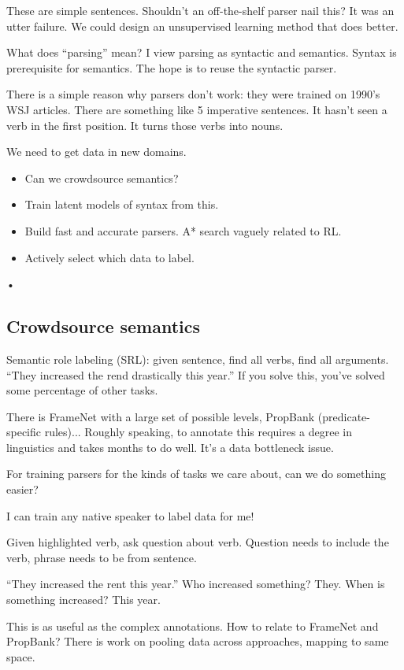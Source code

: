 These are simple sentences. Shouldn't an off-the-shelf parser nail this? It was an utter failure. We could design an unsupervised learning method that does better. 

What does ``parsing'' mean? %
I view parsing as syntactic and semantics. Syntax is prerequisite for semantics. The hope is to reuse the syntactic parser.

There is a simple reason why parsers don't work: they were trained on 1990's WSJ articles. There are something like 5 imperative sentences. It hasn't seen a verb in the first position. It turns those verbs into nouns.

We need to get data in new domains. 
\begin{itemize}
\item
Can we crowdsource semantics?
\item
 Train latent models of syntax from this.
\item
Build fast and accurate parsers. A* search vaguely related to RL.
\item
Actively select which data to label.
\end{itemize}•

\subsection{Crowdsource semantics}

Semantic role labeling (SRL): given sentence, find all verbs, find all arguments. 
``They increased the rend drastically this year.'' 
If you solve this, you've solved some percentage of other tasks.

There is FrameNet with a large set of possible levels, PropBank (predicate-specific rules)... Roughly speaking, to annotate this requires a degree in linguistics and takes months to do well. It's a data bottleneck issue.

For training parsers for the kinds of tasks we care about, can we do something easier?

I can train any native speaker to label data for me!

Given highlighted verb, ask question about verb.  Question needs to include the verb, phrase needs to be from sentence.

``They increased the rent this year.''
Who increased something? They. When is something increased? This year.

This is as useful as the complex annotations. How to relate to FrameNet and PropBank? There is work on pooling data across approaches, mapping to same space.

